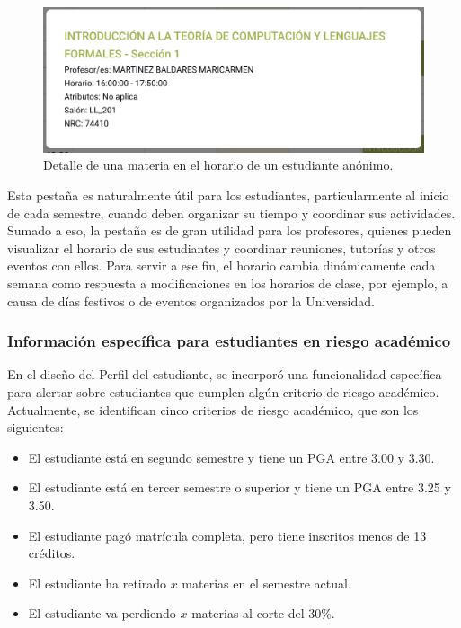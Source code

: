 \begin{figure}[H]
	\includegraphics[width=\textwidth]{assets/nes/detalle_horario.png}
	\caption{Detalle de una materia en el horario de un estudiante anónimo.}
	\label{fig:detalle_horario}
\end{figure}

Esta pestaña es naturalmente útil para los estudiantes, particularmente al inicio de cada semestre, cuando deben organizar su tiempo y coordinar sus actividades. Sumado a eso, la pestaña es de gran utilidad para los profesores, quienes pueden visualizar el horario de sus estudiantes y coordinar reuniones, tutorías y otros eventos con ellos. Para servir a ese fin, el horario cambia dinámicamente cada semana como respuesta a modificaciones en los horarios de clase, por ejemplo, a causa de días festivos o de eventos organizados por la Universidad.

\subsubsection{Información específica para estudiantes en riesgo académico}

En el diseño del Perfil del estudiante, se incorporó una funcionalidad específica para alertar sobre estudiantes que cumplen algún criterio de riesgo académico. Actualmente, se identifican cinco criterios de riesgo académico, que son los siguientes:
\begin{itemize}
	\item El estudiante está en segundo semestre y tiene un PGA entre 3.00 y 3.30.
	\item El estudiante está en tercer semestre o superior y tiene un PGA entre 3.25 y 3.50.
	\item El estudiante pagó matrícula completa, pero tiene inscritos menos de 13 créditos.
	\item El estudiante ha retirado $x$ materias en el semestre actual.
	\item El estudiante va perdiendo $x$ materias al corte del 30\%.
\end{itemize}

